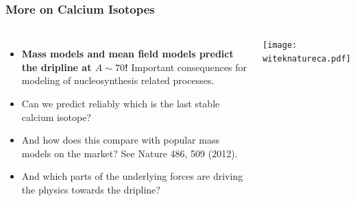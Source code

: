 \documentclass[compress]{beamer}
\begin{document}
{
  \frametitle{More on Calcium Isotopes}
      \begin{footnotesize}
     \begin{columns}
      \column{5.0cm}
\begin{itemize}
\item {\bf Mass models and mean field models predict the dripline at $A\sim 70$!} Important consequences for modeling of nucleosynthesis related processes.
\item Can we predict reliably which is the last stable calcium isotope? 
\item And how
does this compare with popular mass models on the market? See Nature 486, 509 (2012). 
\item And which parts of the underlying forces
are driving the physics towards the dripline?
\end{itemize}
\column{6cm}
\vspace{-3cm}
      \begin{center}
	\texttt{[image: witeknatureca.pdf]}
      \end{center}
\end{columns}
      \end{footnotesize}
}
\frame
\end{document}
